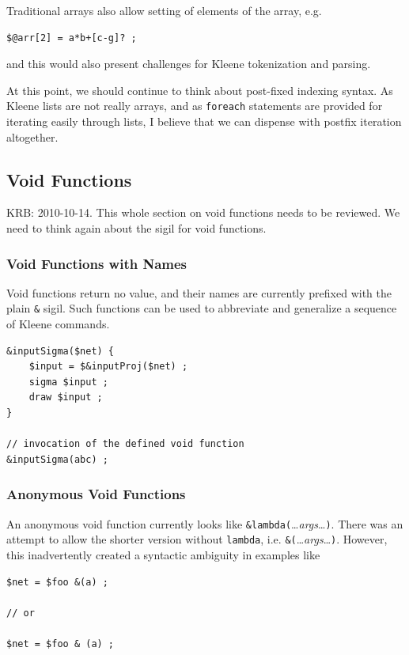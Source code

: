\documentclass[letterpaper,12pt]{article}
\begin{document}
Traditional arrays also allow setting of elements of the array, e.g.

\begin{Verbatim}[fontsize=\small]
$@arr[2] = a*b+[c-g]? ;
\end{Verbatim}

\noindent
and this would also present challenges for Kleene tokenization and parsing.

At this point, we should continue to think about post-fixed indexing
syntax.  As Kleene lists are not really arrays, and as \texttt{foreach}
statements are provided for iterating easily through lists, I believe
that we can dispense with postfix iteration altogether.


\subsection{Void Functions}

KRB:  2010-10-14.  This whole section on void functions needs to be
reviewed.  We need to think again about the sigil for void functions.

\subsubsection{Void Functions with Names}

Void functions return no value, and their names are currently 
prefixed with the plain \verb!&!
sigil.  Such functions can be used to abbreviate and generalize a
sequence of Kleene commands.

\begin{Verbatim}[fontsize=\small]
&inputSigma($net) {
	$input = $&inputProj($net) ;
	sigma $input ;
	draw $input ;
}

// invocation of the defined void function
&inputSigma(abc) ;
\end{Verbatim}

\subsubsection{Anonymous Void Functions}

An anonymous void function currently looks like
\verb!&lambda(!\ldots\emph{args}\ldots\verb!)!.  There was an attempt
to allow the shorter version without \texttt{lambda}, i.e.\@
\verb!&(!\ldots\emph{args}\ldots\verb!)!.  However, this inadvertently
created a syntactic ambiguity in examples like

\begin{Verbatim}[fontsize=\small]
$net = $foo &(a) ;

// or

$net = $foo & (a) ;
\end{Verbatim}
\end{document}
